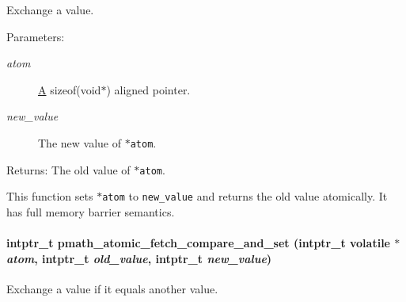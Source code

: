 Exchange a value. 

\begin{Desc}
\item[Parameters:]
\begin{description}
\item[{\em atom}]\hyperlink{class_a}{A} sizeof(void$\ast$) aligned pointer. \item[{\em new\_\-value}]The new value of {\tt $\ast$atom}. \end{description}
\end{Desc}
\begin{Desc}
\item[Returns:]The old value of {\tt $\ast$atom}.\end{Desc}
This function sets {\tt $\ast$atom} to {\tt new\_\-value} and returns the old value atomically. It has full memory barrier semantics. \hypertarget{group__atomic__ops_g0eb65b0a5caacf019bf1c97616f69603}{
\paragraph[{pmath\_\-atomic\_\-fetch\_\-compare\_\-and\_\-set}]{\setlength{\rightskip}{0pt plus 5cm}intptr\_\-t pmath\_\-atomic\_\-fetch\_\-compare\_\-and\_\-set (intptr\_\-t volatile $\ast$ {\em atom}, \/  intptr\_\-t {\em old\_\-value}, \/  intptr\_\-t {\em new\_\-value})}\hfill}
\label{group__atomic__ops_g0eb65b0a5caacf019bf1c97616f69603}


Exchange a value if it equals another value. 


